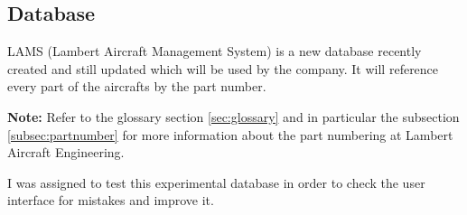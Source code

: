 \documentclass[11pt,a4paper]{article}
\begin{document}

\newpage

\subsection{Database}
LAMS (Lambert Aircraft Management System) is a new database recently created and still updated which will be used by the company. It will reference every part of the aircrafts by the part number.

\bigskip

\textbf{Note:} Refer to the glossary section \ref{sec:glossary} and in particular the subsection \ref{subsec:partnumber} for more information about the part numbering at Lambert Aircraft Engineering.

\bigskip

I was assigned to test this experimental database in order to check the user interface for mistakes and improve it.
\end{document}
